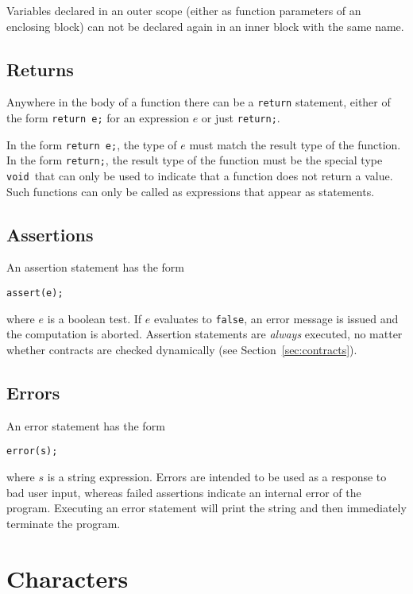 \documentclass[11pt]{article}
\newcommand{\tvoid}{\texttt{void}}
\begin{document}
Variables declared in an outer scope (either as function
parameters of an enclosing block) can not be declared again
in an inner block with the same name.

\subsection{Returns}

Anywhere in the body of a function there can be a \lstinline'return'
statement, either of the form \lstinline'return e;' for an expression $e$
or just \lstinline'return;'.

In the form \lstinline'return e;', the type of $e$ must match the result
type of the function.  In the form \lstinline'return;', the result type of
the function must be the special type \tvoid\ that can only be
used to indicate that a function does not return a value.  Such
functions can only be called as expressions that appear as statements.

\subsection{Assertions}

An assertion statement has the form
\begin{lstlisting}
assert(e);
\end{lstlisting}
where $e$ is a boolean test.  If $e$ evaluates to \lstinline'false', an
error message is issued and the computation is aborted.  Assertion
statements are \emph{always} executed, no matter whether contracts are
checked dynamically (see Section~\ref{sec:contracts}).

\subsection{Errors}

An error statement has the form
\begin{lstlisting}
error(s);
\end{lstlisting}
where $s$ is a string expression. Errors are intended to be used as a
response to bad user input, whereas failed assertions indicate an
internal error of the program. Executing an error statement will print
the string and then immediately terminate the program.

\section{Characters}
\end{document}
